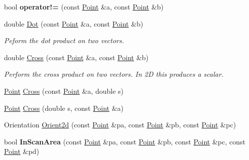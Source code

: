 \begin{DoxyCompactItemize}
\mbox{\label{namespacep2t_aef209c6c873f146ba2c2ff1f2174f9f6}} 
bool {\bfseries operator!=} (const \hyperlink{structp2t_1_1Point}{Point} \&a, const \hyperlink{structp2t_1_1Point}{Point} \&b)
\item 
\mbox{\label{namespacep2t_a7f992d12c1c4fecfd9914e9f6d871f2d}} 
double \hyperlink{namespacep2t_a7f992d12c1c4fecfd9914e9f6d871f2d}{Dot} (const \hyperlink{structp2t_1_1Point}{Point} \&a, const \hyperlink{structp2t_1_1Point}{Point} \&b)
\begin{DoxyCompactList}\small\item\em Peform the dot product on two vectors. \end{DoxyCompactList}\item 
\mbox{\label{namespacep2t_afc804f5616661c8a9ddb798cdeb4564e}} 
double \hyperlink{namespacep2t_afc804f5616661c8a9ddb798cdeb4564e}{Cross} (const \hyperlink{structp2t_1_1Point}{Point} \&a, const \hyperlink{structp2t_1_1Point}{Point} \&b)
\begin{DoxyCompactList}\small\item\em Perform the cross product on two vectors. In 2D this produces a scalar. \end{DoxyCompactList}\item 
\hyperlink{structp2t_1_1Point}{Point} \hyperlink{namespacep2t_aea08cc5eefe8a698251b03beabff716a}{Cross} (const \hyperlink{structp2t_1_1Point}{Point} \&a, double s)
\item 
\hyperlink{structp2t_1_1Point}{Point} \hyperlink{namespacep2t_ae4e351c78d87c5a772f1dd6be7540803}{Cross} (double s, const \hyperlink{structp2t_1_1Point}{Point} \&a)
\item 
Orientation \hyperlink{namespacep2t_a9fa090c7f13c6b2665d3bdcd48b3478b}{Orient2d} (const \hyperlink{structp2t_1_1Point}{Point} \&pa, const \hyperlink{structp2t_1_1Point}{Point} \&pb, const \hyperlink{structp2t_1_1Point}{Point} \&pc)
\item 
\mbox{\label{namespacep2t_a1330a3bcb418a415c43ea27af996231d}} 
bool {\bfseries In\+Scan\+Area} (const \hyperlink{structp2t_1_1Point}{Point} \&pa, const \hyperlink{structp2t_1_1Point}{Point} \&pb, const \hyperlink{structp2t_1_1Point}{Point} \&pc, const \hyperlink{structp2t_1_1Point}{Point} \&pd)
\end{DoxyCompactItemize}
